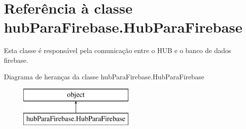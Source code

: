 \hypertarget{classhub_para_firebase_1_1_hub_para_firebase}{}\section{Referência à classe hub\+Para\+Firebase.\+Hub\+Para\+Firebase}
\label{classhub_para_firebase_1_1_hub_para_firebase}


Esta classe é responsável pela comunicação entre o H\+UB e o banco de dados firebase.  


Diagrama de heranças da classe hub\+Para\+Firebase.\+Hub\+Para\+Firebase\begin{figure}[H]
\begin{center}
\leavevmode
\includegraphics[height=2.000000cm]{classhub_para_firebase_1_1_hub_para_firebase}
\end{center}
\end{figure}
